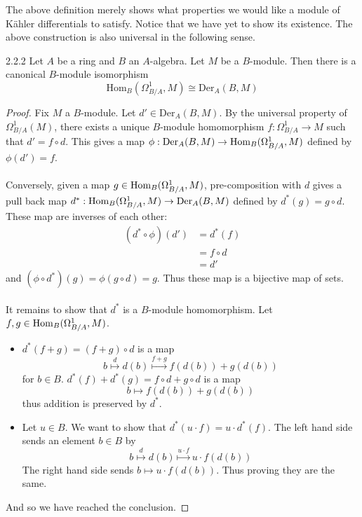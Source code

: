 \documentclass[a4paper]{article}
\begin{document}
The above definition merely shows what properties we would like a module of Kähler differentials to satisfy. Notice that we have yet to show its existence. The above construction is also universal in the following sense. 

\begin{lmm}{}{2.2.2} Let $A$ be a ring and $B$ an $A$-algebra. Let $M$ be a $B$-module. Then there is a canonical $B$-module isomorphism $$\text{Hom}_B(\Omega_{B/A}^1,M)\cong\text{Der}_A(B,M)$$ \tcbline
\begin{proof}
Fix $M$ a $B$-module. Let $d'\in\text{Der}_A(B,M)$. By the universal property of $\Omega_{B/A}^1(M)$, there exists a unique $B$-module homomorphism $f:\Omega_{B/A}^1\to M$ such that $d'=f\circ d$. This gives a map $\phi:\text{Der}_A(B,M)\to\operatorname{Hom}_B(\Omega_{B/A}^1,M)$ defined by $\phi(d')=f$. \\~\\
Conversely, given a map $g\in\operatorname{Hom}_B(\Omega_{B/A}^1,M)$, pre-composition with $d$ gives a pull back map $d^\ast:\operatorname{Hom}_B(\Omega_{B/A}^1,M)\to\text{Der}_A(B,M)$ defined by $d^\ast(g)=g\circ d$. These map are inverses of each other: 
\begin{align*}
(d^\ast\circ\phi)(d')&=d^\ast(f)\\
&=f\circ d\\
&=d'\tag{By universal property}
\end{align*} and 
$(\phi\circ d^\ast)(g)=\phi(g\circ d)=g$. 
Thus these map is a bijective map of sets. \\~\\

It remains to show that $d^\ast$ is a $B$-module homomorphism. Let $f,g\in\operatorname{Hom}_B(\Omega_{B/A}^1,M)$. 
\begin{itemize}
\item $d^\ast(f+g)=(f+g)\circ d$ is a map $$b\overset{d}{\mapsto}d(b)\overset{f+g}{\mapsto}f(d(b))+g(d(b))$$ for $b\in B$. $d^\ast(f)+d^\ast(g)=f\circ d+g\circ d$ is a map $$b\mapsto f(d(b))+g(d(b))$$ thus addition is preserved by $d^\ast$. 
\item Let $u\in B$. We want to show that $d^\ast(u\cdot f)=u\cdot d^\ast(f)$. The left hand side sends an element $b\in B$ by $$b\overset{d}{\mapsto}d(b)\overset{u\cdot f}{\mapsto}u\cdot f(d(b))$$ The right hand side sends $b\mapsto u\cdot f(d(b))$. Thus proving they are the same. 
\end{itemize}
And so we have reached the conclusion. 
\end{proof}
\end{lmm}
\end{document}
